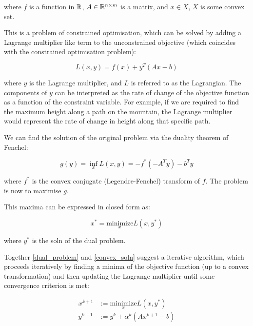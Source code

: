 where \(f\) is a function in \({\mathbb{R}}\), \(A \in {\mathbb{R}}^{n \times m}\) is a matrix, and \(x\in X\), \(X\) is some convex set.

This is a problem of constrained optimisation, which can be solved by adding a Lagrange multiplier like term to the unconstrained objective (which coincides with the constrained optimisation problem): 

\begin{equation}
L\left(x,y\right) = f\left( x \right) + y^T\left(Ax-b\right)
\end{equation}

where \(y\) is the Lagrange multiplier, and \(L\) is referred to as the Lagrangian. The components of \(y\) can be interpreted as the rate of change of the objective function as a function of the constraint variable. For example, if we are required to find the maximum height along a path on the mountain, the Lagrange multiplier would represent the rate of change in height along that specific path. 

We can find the solution of the original problem via the duality theorem of Fenchel:

\begin{equation}
g\left(y\right) = \inf_x L\left(x,y\right) = -f^*\left(-A^Ty\right) -b^Ty
\label{dual_problem}
\end{equation}

where \(f^*\) is the convex conjugate (Legendre-Fenchel) transform of \(f\). The problem is now to maximise \(g\). 

This maxima can be expressed in closed form as:

\begin{equation}
x^* = \underset{x}{\text{minimize}} L\left(x, y^*\right) 
\label{convex_soln}
\end{equation}

where \(y^*\) is the soln of the dual problem. 

Together \ref{dual_problem} and \ref{convex_soln} suggest a iterative algorithm, which proceeds iteratively by finding a minima of the objective function (up to a convex transformation) and then updating the Lagrange multiplier until some convergence criterion is met: 

\begin{align}
x^{k+1} &:= \underset{x}{\text{minimize}} L\left(x, y^*\right)  \\
y^{k+1} &:= y^{k} + \alpha^k \left(Ax^{k+1} - b\right)
\label{gradient_ascent}
\end{align}

